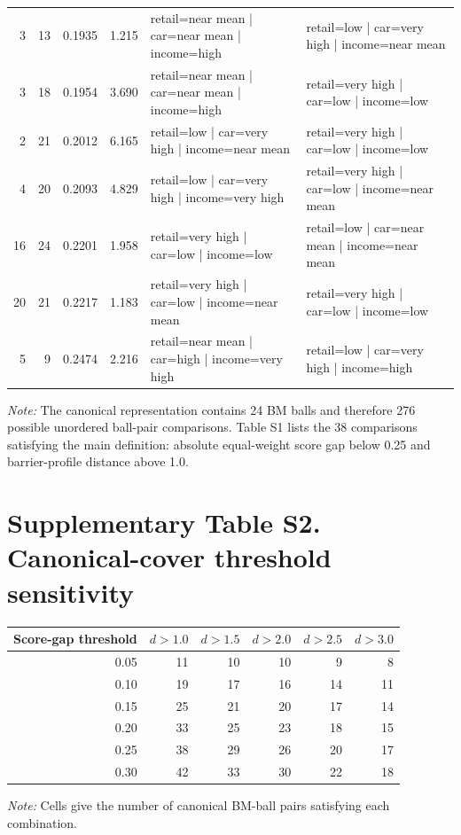 \documentclass[10pt,a4paper]{article}
\begin{document}
\begin{longtable}{rrrrp{4.25cm}p{4.25cm}}
3 & 13 & 0.1935 & 1.215 & retail=near mean | car=near mean | income=high & retail=low | car=very high | income=near mean \\
3 & 18 & 0.1954 & 3.690 & retail=near mean | car=near mean | income=high & retail=very high | car=low | income=low \\
2 & 21 & 0.2012 & 6.165 & retail=low | car=very high | income=near mean & retail=very high | car=low | income=low \\
4 & 20 & 0.2093 & 4.829 & retail=low | car=very high | income=very high & retail=very high | car=low | income=near mean \\
16 & 24 & 0.2201 & 1.958 & retail=very high | car=low | income=low & retail=low | car=near mean | income=near mean \\
20 & 21 & 0.2217 & 1.183 & retail=very high | car=low | income=near mean & retail=very high | car=low | income=low \\
5 & 9 & 0.2474 & 2.216 & retail=near mean | car=high | income=very high & retail=low | car=very high | income=high \\
\bottomrule
\end{longtable}
\normalsize
\textit{Note:} The canonical representation contains 24 BM balls and therefore 276 possible unordered ball-pair comparisons. Table S1 lists the 38 comparisons satisfying the main definition: absolute equal-weight score gap below 0.25 and barrier-profile distance above 1.0.
\section*{Supplementary Table S2. Canonical-cover threshold sensitivity}
\begin{center}\small
\begin{tabular}{rrrrrr}
\toprule
Score-gap threshold & $d>1.0$ & $d>1.5$ & $d>2.0$ & $d>2.5$ & $d>3.0$\\
\midrule
0.05 & 11 & 10 & 10 & 9 & 8\\
0.10 & 19 & 17 & 16 & 14 & 11\\
0.15 & 25 & 21 & 20 & 17 & 14\\
0.20 & 33 & 25 & 23 & 18 & 15\\
0.25 & 38 & 29 & 26 & 20 & 17\\
0.30 & 42 & 33 & 30 & 22 & 18\\
\bottomrule
\end{tabular}
\end{center}
\textit{Note:} Cells give the number of canonical BM-ball pairs satisfying each combination.
\end{document}
